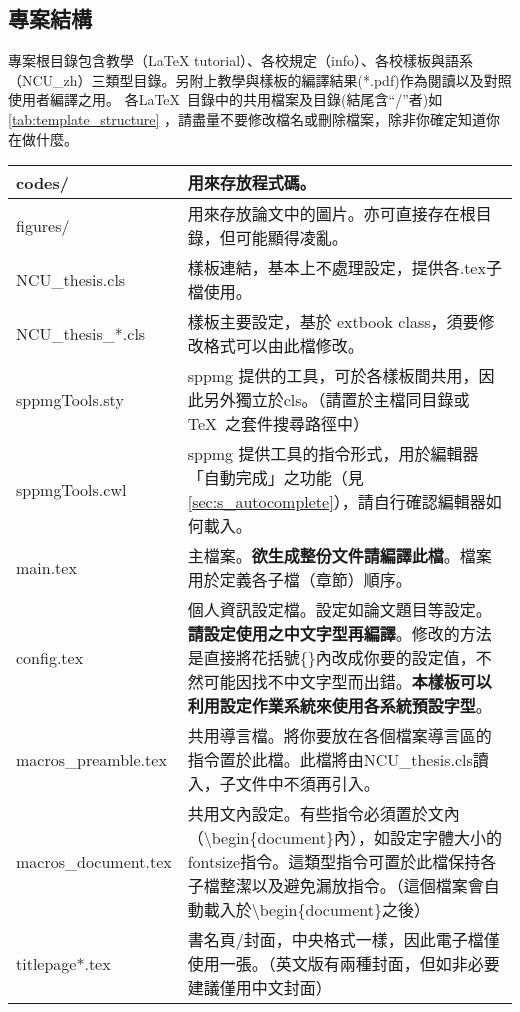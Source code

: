 \documentclass[class=NCU_thesis, crop=false, float=true]{standalone}
\begin{document}
\subsection{專案結構}
\label{sec:s_template_structure}
專案根目錄包含教學（LaTeX tutorial）、各校規定（info）、各校樣板與語系（NCU\_zh）三類型目錄。另附上教學與樣板的編譯結果(*.pdf)作為閱讀以及對照使用者編譯之用。
各\LaTeX\ 目錄中的共用檔案及目錄(結尾含``/''者)如\cref{tab:template_structure} ，請盡量不要修改檔名或刪除檔案，除非你確定知道你在做什麼。
\let\tnote\tptabletnote
\begin{table}
    \centering
    \begin{threeparttable}
    \begin{tabularx}{\textwidth}{| l | X |}
        \hline
        codes/  & 用來存放程式碼。 \\ \hline
        figures/    & 用來存放論文中的圖片。亦可直接存在根目錄，但可能顯得凌亂。 \\ \hline
        NCU\_thesis.cls & 樣板連結，基本上不處理設定，提供各.tex子檔使用。 \\ \hline
        NCU\_thesis\_*.cls & 樣板主要設定，基於 extbook class，須要修改格式可以由此檔修改。 \\ \hline
        sppmgTools.sty & sppmg 提供的工具，可於各樣板間共用，因此另外獨立於cls。（請置於主檔同目錄或 \TeX\ 之套件搜尋路徑中） \\ \hline
        sppmgTools.cwl & sppmg 提供工具的指令形式，用於編輯器「自動完成」之功能（見\cref{sec:s_autocomplete}），請自行確認編輯器如何載入。 \\ \hline
        main.tex & 主檔案。\textbf{欲生成整份文件請編譯此檔}。檔案用於定義各子檔（章節）順序。  \\ \hline
        config.tex & 個人資訊設定檔。設定如論文題目等設定。\textbf{請設定使用之中文字型再編譯}。修改的方法是直接將花括號\{\}內改成你要的設定值\tnote{a}，不然可能因找不中文字型而出錯。\textbf{本樣板可以利用設定作業系統來使用各系統預設字型}。  \\ \hline
        macros\_preamble.tex & 共用導言檔。將你要放在各個檔案導言區\tnote{b}的指令置於此檔。此檔將由NCU\_thesis.cls讀入，子文件中不須再引入。  \\ \hline
        macros\_document.tex & 共用文內設定。有些指令必須置於文內（\textbackslash{}begin\{document\}內），如設定字體大小的fontsize指令。這類型指令可置於此檔保持各子檔整潔以及避免漏放指令。（這個檔案會自動載入於\textbackslash{}begin\{document\}之後）  \\ \hline
        titlepage*.tex & 書名頁/封面，中央格式一樣，因此電子檔僅使用一張。（英文版有兩種封面，但如非必要建議僅用中文封面）  \\ \hline

\end{tabularx}
\end{threeparttable}
\end{table}
\end{document}
